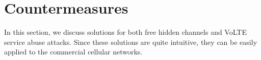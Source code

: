 \chapter{Countermeasures}
\label{sec:cm}
In this section, we discuss solutions for both free hidden channels and VoLTE
service abuse attacks. Since these solutions are quite intuitive, they can be
easily applied to the commercial cellular networks.


